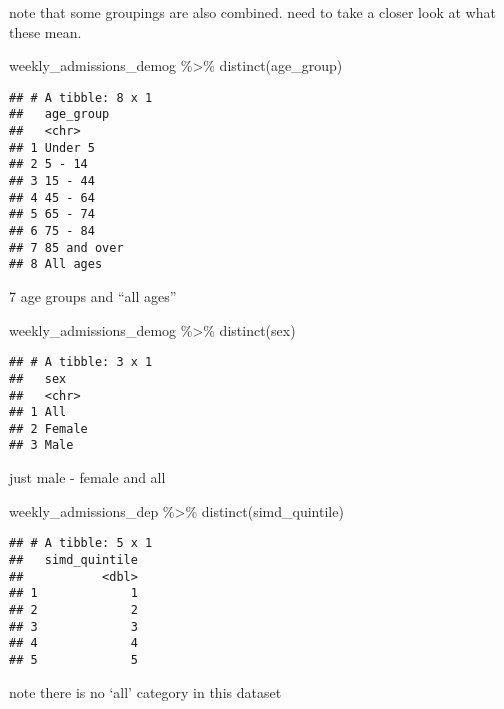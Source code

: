 \documentclass[
]{article}
\newenvironment{Shaded}{\begin{snugshade}}{\end{snugshade}}
\newcommand{\FunctionTok}[1]{\textcolor[rgb]{0.00,0.00,0.00}{#1}}
\newcommand{\NormalTok}[1]{#1}
\newcommand{\SpecialCharTok}[1]{\textcolor[rgb]{0.00,0.00,0.00}{#1}}
\begin{document}
note that some groupings are also combined. need to take a closer look
at what these mean.

\begin{Shaded}
\begin{Highlighting}[]
\NormalTok{weekly\_admissions\_demog }\SpecialCharTok{\%\textgreater{}\%} 
  \FunctionTok{distinct}\NormalTok{(age\_group)}
\end{Highlighting}
\end{Shaded}

\begin{verbatim}
## # A tibble: 8 x 1
##   age_group  
##   <chr>      
## 1 Under 5    
## 2 5 - 14     
## 3 15 - 44    
## 4 45 - 64    
## 5 65 - 74    
## 6 75 - 84    
## 7 85 and over
## 8 All ages
\end{verbatim}

7 age groups and ``all ages''

\begin{Shaded}
\begin{Highlighting}[]
\NormalTok{weekly\_admissions\_demog }\SpecialCharTok{\%\textgreater{}\%} 
  \FunctionTok{distinct}\NormalTok{(sex)}
\end{Highlighting}
\end{Shaded}

\begin{verbatim}
## # A tibble: 3 x 1
##   sex   
##   <chr> 
## 1 All   
## 2 Female
## 3 Male
\end{verbatim}

just male - female and all

\begin{Shaded}
\begin{Highlighting}[]
\NormalTok{weekly\_admissions\_dep }\SpecialCharTok{\%\textgreater{}\%} 
  \FunctionTok{distinct}\NormalTok{(simd\_quintile)}
\end{Highlighting}
\end{Shaded}

\begin{verbatim}
## # A tibble: 5 x 1
##   simd_quintile
##           <dbl>
## 1             1
## 2             2
## 3             3
## 4             4
## 5             5
\end{verbatim}

note there is no `all' category in this dataset
\end{document}
